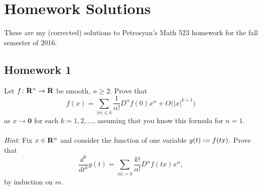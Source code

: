 \section{Homework Solutions}
These are my (corrected) solutions to Petrosyan's Math 523 homework for the
fall semester of 2016.
\subsection{Homework 1}
\begin{problem}
  Let \(f\colon\mathbf{R}^n\to\mathbf{R}\) be smooth, \(n\geq 2\). Prove that
  \[
    f(x)=\sum_{|\alpha|\leq k}
    \frac{1}{\alpha!}D^\alpha f(0)x^\alpha+O\bigl(|x|^{k+1}\bigr)
  \]
  as \(x\to\mathbf{0}\) for each \(k=1,2,\dotsc\), assuming that you know this
  formula for \(n=1\).
  \\\\
  \emph{Hint}: Fix \(x\in\mathbf{R}^n\) and consider the function of
  one variable \(g(t)\defeq f(tx)\). Prove that
  \[
    \frac{d^k}{dt^k}g(t)
    =\sum_{|\alpha|=k}\frac{k!}{\alpha!} D^\alpha f(tx)x^\alpha,
  \]
  by induction on \(m\).
\end{problem}
